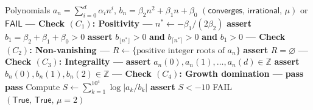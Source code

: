 \documentclass[11pt,a4paper]{article}
\theoremstyle{definition}
\theoremstyle{remark}
\newcommand{\abs}[1]{\lvert #1 \rvert}
\begin{document}
\begin{algorithm}[h]
\caption{\textsc{VerifyGCFIrrationality}$(a_n, b_n)$}\label{alg:verify}
\begin{algorithmic}[1]
\Require Polynomials $a_n = \sum_{i=0}^d \alpha_i n^i$,\quad
  $b_n = \beta_2 n^2 + \beta_1 n + \beta_0$
\Ensure $(\mathsf{converges},\, \mathsf{irrational},\, \mu)$ or $\mathsf{FAIL}$
\Statex
\State \textbf{--- Check $(C_1)$: Positivity ---}
\State $n^* \gets -\beta_1/(2\beta_2)$
  \State \textbf{assert} $b_1 = \beta_2 + \beta_1 + \beta_0 > 0$
\Else
  \State \textbf{assert} $b_{\lfloor n^*\rfloor} > 0$ \textbf{and}
    $b_{\lceil n^*\rceil} > 0$ \textbf{and} $b_1 > 0$
\EndIf
\Statex
\State \textbf{--- Check $(C_2)$: Non-vanishing ---}
\State $R \gets \{\text{positive integer roots of } a_n\}$
\State \textbf{assert} $R = \varnothing$
\Statex
\State \textbf{--- Check $(C_3)$: Integrality ---}
\State \textbf{assert} $a_n(0), a_n(1), \ldots, a_n(d) \in \mathbb{Z}$
\State \textbf{assert} $b_n(0), b_n(1), b_n(2) \in \mathbb{Z}$
\Statex
\State \textbf{--- Check $(C_4)$: Growth domination ---}
  \State \textbf{pass} 
\ElsIf{$d = 2$ \textbf{and} $\abs{\alpha_2} < \beta_2$}
  \State \textbf{pass} 
\ElsIf{$d = 2$ \textbf{and} $\abs{\alpha_2} = \beta_2$}
  \State Compute $S \gets \sum_{k=1}^{10^4} \log\abs{a_k/b_k}$
  \State \textbf{assert} $S < -10$ 
\Else
  \State \Return \textsf{FAIL}
\EndIf
\Statex
\State \Return $(\mathsf{True},\, \mathsf{True},\, \mu = 2)$
\end{algorithmic}
\end{algorithm}
\end{document}
